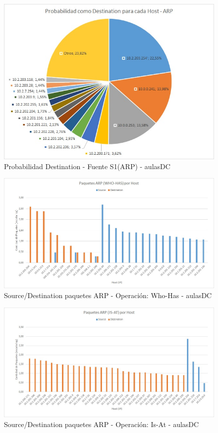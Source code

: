 \begin{figure}[h!]
\centering
\includegraphics[width=\textwidth]{./img/proba_dst_aulasDC.jpg}
\caption{Probabilidad Destination - Fuente S1(ARP) - aulasDC}
\end{figure}
\newpage

\begin{figure}[h!]
\centering
\includegraphics[width=\textwidth]{./img/arp_whoHas_aulasDC.jpg}
\caption{Source/Destination paquetes ARP - Operación: Who-Has - aulasDC}
\end{figure}

\begin{figure}[h!]
\centering
\includegraphics[width=\textwidth]{./img/arp_isAt_aulasDC.jpg}
\caption{Source/Destination paquetes ARP - Operación: Is-At - aulasDC}
\end{figure}
